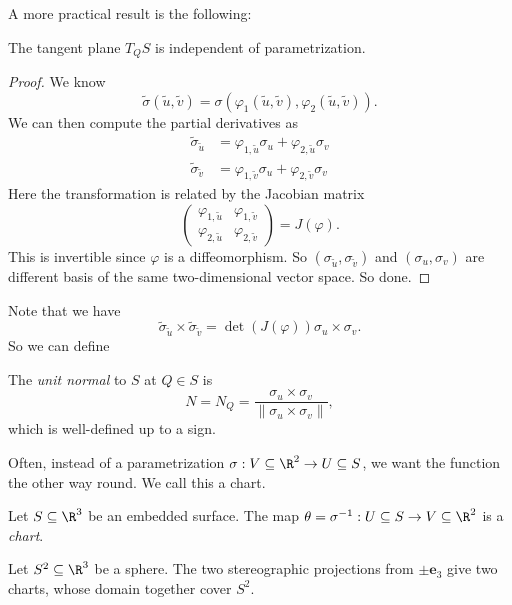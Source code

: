 \documentclass[a4paper]{article}
\begin{document}
A more practical result is the following:
\begin{cor}
  The tangent plane $T_Q S$ is independent of parametrization.
\end{cor}

\begin{proof}
  We know
  \[
    \tilde{\sigma} (\tilde{u}, \tilde{v}) = \sigma(\varphi_1(\tilde{u}, \tilde{v}), \varphi_2(\tilde{u}, \tilde{v})).
  \]
  We can then compute the partial derivatives as
  \begin{align*}
    \tilde{\sigma}_{\tilde{u}} &= \varphi_{1, \tilde{u}} \sigma_u + \varphi_{2, \tilde{u}} \sigma_v\\
    \tilde{\sigma}_{\tilde{v}} &= \varphi_{1, \tilde{v}} \sigma_u + \varphi_{2, \tilde{v}} \sigma_v
  \end{align*}
  Here the transformation is related by the Jacobian matrix
  \[
    \begin{pmatrix}
      \varphi_{1, \tilde{u}} & \varphi_{1, \tilde{v}}\\
      \varphi_{2, \tilde{u}} & \varphi_{2, \tilde{v}}
    \end{pmatrix} = J(\varphi).
  \]
  This is invertible since $\varphi$ is a diffeomorphism. So $(\sigma_{\tilde{u}}, \sigma_{\tilde{v}})$ and $(\sigma_{u}, \sigma_v)$ are different basis of the same two-dimensional vector space. So done.
\end{proof}

Note that we have
\[
  \tilde{\sigma}_{\tilde{u}} \times \tilde{\sigma}_{\tilde{v}} = \det(J(\varphi)) \sigma_u \times \sigma_v.
\]
So we can define
\begin{defi}
  The \emph{unit normal} to $S$ at $Q \in S$ is
  \[
    N = N_Q = \frac{\sigma_u \times \sigma_v}{\|\sigma_u \times \sigma_v\|},
  \]
  which is well-defined up to a sign.
\end{defi}

Often, instead of a parametrization $\sigma: V \subseteq \R^2 \to U \subseteq S$, we want the function the other way round. We call this a chart.
\begin{defi}[Chart]
  Let $S \subseteq \R^3$ be an embedded surface. The map $\theta= \sigma^{-1}: U \subseteq S \to V \subseteq \R^2$ is a \emph{chart}.
\end{defi}

\begin{eg}
  Let $S^2 \subseteq \R^3$ be a sphere. The two stereographic projections from $\pm \mathbf{e}_3$ give two charts, whose domain together cover $S^2$.
\end{eg}
\end{document}
